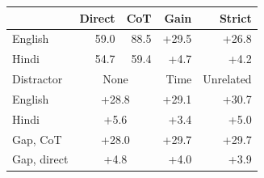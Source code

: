 \begin{tabular}{@{}lrrrr@{}}
\toprule
& Direct & CoT & Gain & Strict \\
\midrule
English & 59.0 & 88.5 & +29.5 & +26.8 \\
Hindi & 54.7 & 59.4 & +4.7 & +4.2 \\
\midrule
Distractor & \multicolumn{2}{c}{None} & Time & Unrelated \\
English & \multicolumn{2}{c}{+28.8} & +29.1 & +30.7 \\
Hindi & \multicolumn{2}{c}{+5.6} & +3.4 & +5.0 \\
Gap, CoT & \multicolumn{2}{c}{+28.0} & +29.7 & +29.7 \\
Gap, direct & \multicolumn{2}{c}{+4.8} & +4.0 & +3.9 \\
\bottomrule
\end{tabular}
